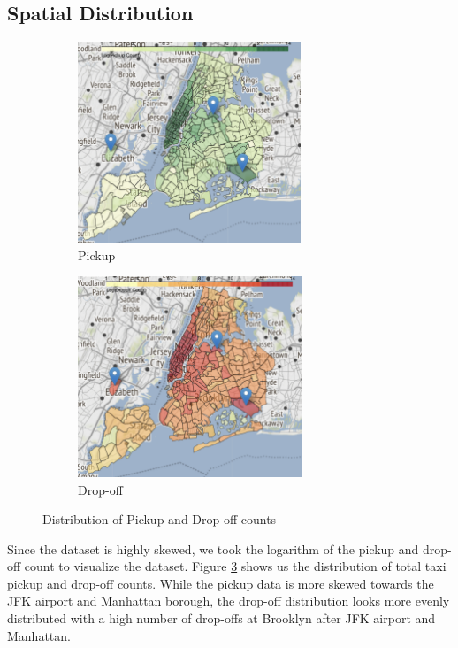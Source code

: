 \documentclass[11pt]{article}
\begin{document}
\subsection{Spatial Distribution}

\begin{figure}[h]
    \begin{subfigure}{0.5\textwidth}
        \includegraphics[width=0.9\linewidth, height=6cm]{pickup_choropleth.png} 
        \caption{Pickup}
        \label{fig:pickup_choropleth}
    \end{subfigure}
    \begin{subfigure}{0.5\textwidth}
        \includegraphics[width=0.9\linewidth, height=6cm]{dropoff_choropleth.png}
        \caption{Drop-off}
        \label{fig:dropoff_choropleth}
    \end{subfigure}
\caption{Distribution of Pickup and Drop-off counts}
\label{fig:taxi_choropleth}
\end{figure}

Since the dataset is highly skewed, we took the logarithm of the pickup and drop-off count to visualize the dataset. Figure \ref{fig:taxi_choropleth} shows us the distribution of total taxi pickup and drop-off counts. While the pickup data is more skewed towards the JFK airport and Manhattan borough, the drop-off distribution looks more evenly distributed with a high number of drop-offs at Brooklyn after JFK airport and Manhattan.
\end{document}
